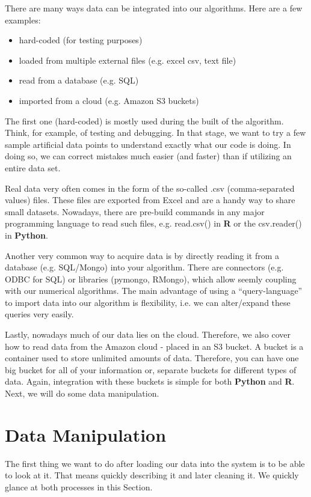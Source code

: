 There are many ways data can be integrated into our algorithms. Here are a few examples:

\begin{itemize}
\item hard-coded (for testing purposes)
\item loaded from multiple external files (e.g. excel csv, text file)
\item read from a database (e.g. SQL)
\item imported from a cloud (e.g. Amazon S3 buckets)
\end{itemize}

The first one (hard-coded) is mostly used during the built of the algorithm. Think, for example, of testing and debugging. In that stage, we want to try a few sample artificial data points to understand exactly what our code is doing. In doing so, we can correct mistakes much easier (and faster) than if utilizing an entire data set. 

Real data very often comes in the form of the so-called .csv (comma-separated values) files. These files are exported from Excel and are a handy way to share small datasets. Nowadays, there are pre-build commands in any major programming language to read such files, e.g. read.csv() in \textbf{R} or the csv.reader() in \textbf{Python}.

Another very common way to acquire data is by directly reading it from a database (e.g. SQL/Mongo) into your algorithm. There are connectors (e.g. ODBC for SQL) or libraries (pymongo, RMongo), which allow seemly coupling with our numerical algorithms. The main advantage of using a ``query-language'' to import data into our algorithm is flexibility, i.e. we can alter/expand these queries very easily.

Lastly, nowadays much of our data lies on the cloud. Therefore, we also cover how to read data from the Amazon cloud - placed in an S3 bucket. A bucket is a container used to store unlimited amounts of data. Therefore, you can have one big bucket for all of your information or, separate buckets for different types of data. Again, integration with these buckets is simple for both \textbf{Python} and \textbf{R}. Next, we will do some data manipulation.

\section{Data Manipulation}\label{dataM} 

The first thing we want to do after loading our data into the system is to be able to look at it. That means quickly describing it and later cleaning it. We quickly glance at both processes in this Section.

